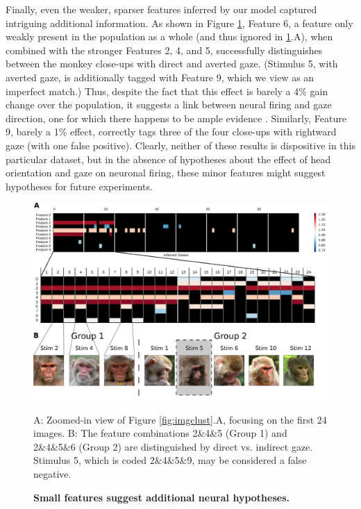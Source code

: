 \documentclass[10pt,letterpaper]{article}
\begin{document}
Finally, even the weaker, sparser features inferred by our model captured intriguing additional information. As shown in Figure \ref{fig:imgclust_sub}, Feature 6, a feature only weakly present in the population as a whole (and thus ignored in \ref{fig:imgclust_sub}.A), when combined with the stronger Features 2, 4, and 5, successfully distinguishes between the monkey close-ups with direct and averted gaze. (Stimulus 5, with averted gaze, is additionally tagged with Feature 9, which we view as an imperfect match.) Thus, despite the fact that this effect is barely a 4\% gain change over the population, it suggests a link between neural firing and gaze direction, one for which there happens to be ample evidence \cite{Perrett23}. Similarly, Feature 9, barely a 1\% effect, correctly tags three of the four close-ups with rightward gaze (with one false positive). Clearly, neither of these results is dispositive in this particular dataset, but in the absence of hypotheses about the effect of head orientation and gaze on neuronal firing, these minor features might suggest hypotheses for future experiments.

\begin{figure}[!h]
    \includegraphics[width=\linewidth]{figures/imgclust_subgroups}
	\caption{\bf Small features suggest additional neural hypotheses.}
	A: Zoomed-in view of Figure \ref{fig:imgclust}.A, focusing on the first 24 images. B: The feature combinations 2\&4\&5 (Group 1) and 2\&4\&5\&6 (Group 2) are distinguished by direct vs. indirect gaze. Stimulus 5, which is coded 2\&4\&5\&9, may be considered a false negative.
	\label{fig:imgclust_sub}
\end{figure}
\end{document}
